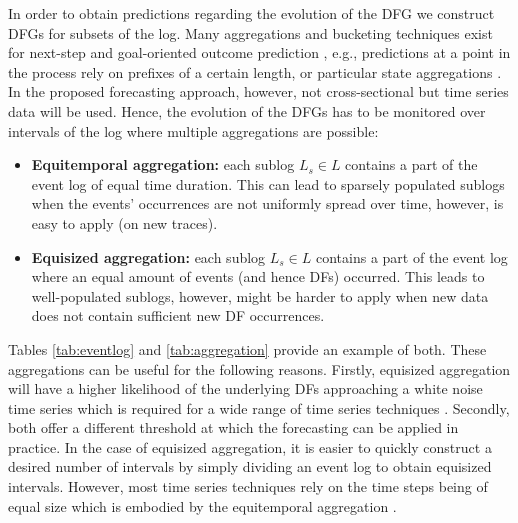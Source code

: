 In order to obtain predictions regarding the evolution of the DFG we construct DFGs for subsets of the log.
Many aggregations and bucketing techniques exist for next-step and goal-oriented outcome prediction \cite{DBLP:conf/caise/TaxVRD17,DBLP:journals/tkdd/TeinemaaDRM19}, e.g., predictions at a point in the process rely on prefixes of a certain length, or particular state aggregations \cite{DBLP:journals/sosym/AalstRVDKG10}.
In the proposed forecasting approach, however, not cross-sectional but time series data will be used.
Hence, the evolution of the DFGs has to be monitored over intervals of the log where multiple aggregations are possible:
\begin{itemize}
	\item \textbf{Equitemporal aggregation:} each sublog $L_s\in L$ contains a part of the event log of equal time duration. This can lead to sparsely populated sublogs when the events' occurrences are not uniformly spread over time, however, is easy to apply (on new traces).
	\item \textbf{Equisized aggregation:} each sublog $L_s\in L$ contains a part of the event log where an equal amount of events (and hence DFs) occurred. This leads to well-populated sublogs, however, might be harder to apply when new data does not contain sufficient new DF occurrences.
\end{itemize}
Tables \ref{tab:eventlog} and \ref{tab:aggregation} provide an example of both.
These aggregations can be useful for the following reasons.
Firstly, equisized aggregation will have a higher likelihood of the underlying DFs approaching a white noise time series which is required for a wide range of time series techniques \cite{hyndman2018forecasting}. 
Secondly, both offer a different threshold at which the forecasting can be applied in practice.
In the case of equisized aggregation, it is easier to quickly construct a desired number of intervals by simply dividing an event log to obtain equisized intervals.
However, most time series techniques rely on the time steps being of equal size which is embodied by the equitemporal aggregation \cite{kil1997optimum}.
